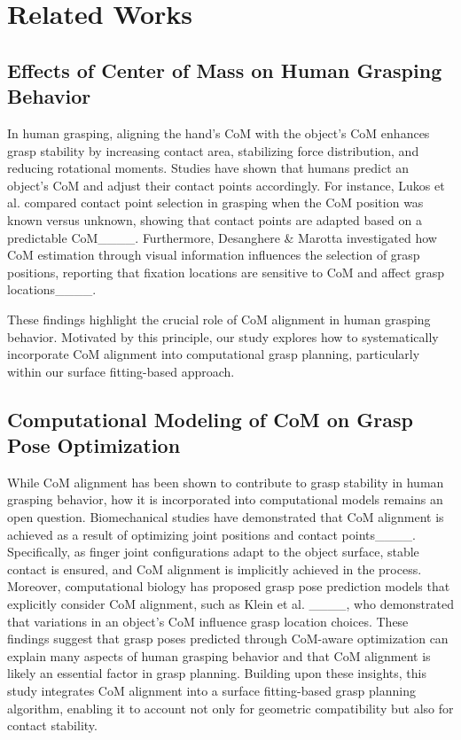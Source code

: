 \section{Related Works}
\subsection{Effects of Center of Mass on Human Grasping Behavior}
        In human grasping, aligning the hand's CoM with the object's CoM enhances grasp stability by increasing contact area, stabilizing force distribution, and reducing rotational moments. Studies have shown that humans predict an object's CoM and adjust their contact points accordingly.
        For instance, Lukos et al. compared contact point selection in grasping when the CoM position was known versus unknown, showing that contact points are adapted based on a predictable CoM____.
        Furthermore, Desanghere \& Marotta investigated how CoM estimation through visual information influences the selection of grasp positions, reporting that fixation locations are sensitive to CoM and affect grasp locations____.
        
        These findings highlight the crucial role of CoM alignment in human grasping behavior. Motivated by this principle, our study explores how to systematically incorporate CoM alignment into computational grasp planning, particularly within our surface fitting-based approach.


    \subsection{Computational Modeling of CoM on Grasp Pose Optimization}
        While CoM alignment has been shown to contribute to grasp stability in human grasping behavior, how it is incorporated into computational models remains an open question.
        Biomechanical studies have demonstrated that CoM alignment is achieved as a result of optimizing joint positions and contact points____.
        Specifically, as finger joint configurations adapt to the object surface, stable contact is ensured, and CoM alignment is implicitly achieved in the process.
        Moreover, computational biology has proposed grasp pose prediction models that explicitly consider CoM alignment, such as Klein et al. ____, who demonstrated that variations in an object's CoM influence grasp location choices. These findings suggest that grasp poses predicted through CoM-aware optimization can explain many aspects of human grasping behavior and that CoM alignment is likely an essential factor in grasp planning. Building upon these insights, this study integrates CoM alignment into a surface fitting-based grasp planning algorithm, enabling it to account not only for geometric compatibility but also for contact stability.



